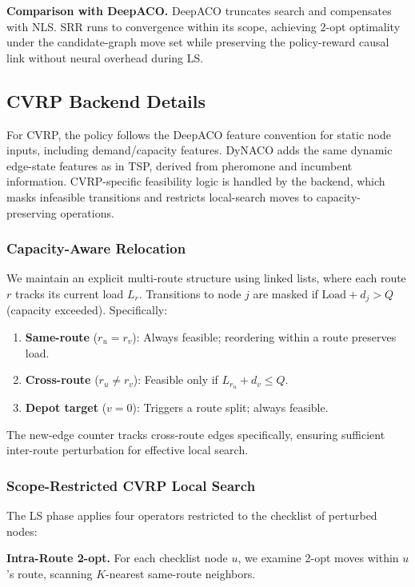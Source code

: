 \documentclass[sigconf]{acmart}
\begin{document}
\textbf{Comparison with DeepACO.}
DeepACO truncates search and compensates with NLS.
SRR runs to convergence within its scope, achieving 2-opt optimality under the candidate-graph move set while preserving the policy-reward causal link without neural overhead during LS.

\subsection{CVRP Backend Details}
\label{app:cvrp}

For CVRP, the policy follows the DeepACO feature convention for static node inputs, including demand/capacity features. DyNACO adds the same dynamic edge-state features as in TSP, derived from pheromone and incumbent information. CVRP-specific feasibility logic is handled by the backend, which masks infeasible transitions and restricts local-search moves to capacity-preserving operations.

\subsubsection{Capacity-Aware Relocation}
We maintain an explicit multi-route structure using linked lists, where each route $r$ tracks its current load $L_r$.
Transitions to node $j$ are masked if $\text{Load} + d_j > Q$ (capacity exceeded).
Specifically:
\begin{enumerate}
    \item \textbf{Same-route} ($r_u = r_v$): Always feasible; reordering within a route preserves load.
    \item \textbf{Cross-route} ($r_u \neq r_v$): Feasible only if $L_{r_u} + d_v \leq Q$.
    \item \textbf{Depot target} ($v = 0$): Triggers a route split; always feasible.
\end{enumerate}
The new-edge counter tracks cross-route edges specifically, ensuring sufficient inter-route perturbation for effective local search.

\subsubsection{Scope-Restricted CVRP Local Search}
The LS phase applies four operators restricted to the checklist of perturbed nodes:

\textbf{Intra-Route 2-opt.}
For each checklist node $u$, we examine 2-opt moves within $u$'s route, scanning $K$-nearest same-route neighbors.
\end{document}
